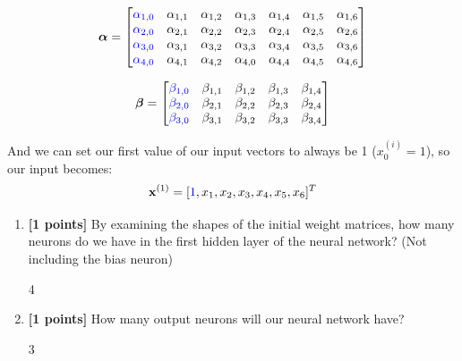 \documentclass[11pt]{article}
\numberwithin{equation}{section} %
\numberwithin{figure}{section} %
\numberwithin{table}{section} %
\newcommand{\xv}{\mathbf{x}}
\newcommand{\points}[1]{{\bf [#1 points]}}
\begin{document}
\begin{enumerate}
$$\boldsymbol{\alpha}=
    \begin{bmatrix}
    \textcolor{blue}{\alpha_{1,0}} & \alpha_{1,1} & \alpha_{1,2} & \alpha_{1,3} & \alpha_{1,4} & \alpha_{1,5} & \alpha_{1,6} \\
    \textcolor{blue}{\alpha_{2,0}} & \alpha_{2,1} & \alpha_{2,2} & \alpha_{2,3} & \alpha_{2,4} & \alpha_{2,5} & \alpha_{2,6} \\
    \textcolor{blue}{\alpha_{3,0}} & \alpha_{3,1} & \alpha_{3,2} & \alpha_{3,3} & \alpha_{3,4} & \alpha_{3,5} & \alpha_{3,6} \\
    \textcolor{blue}{\alpha_{4,0}} & \alpha_{4,1} & \alpha_{4,2} & \alpha_{4,0} & \alpha_{4,4} & \alpha_{4,5} & \alpha_{4,6}
    \end{bmatrix}$$
    
$$\boldsymbol{\beta}=
    \begin{bmatrix}
    \textcolor{blue}{\beta_{1,0}} & \beta_{1,1} & \beta_{1,2} & \beta_{1,3} & \beta_{1,4} \\
    \textcolor{blue}{\beta_{2,0}} & \beta_{2,1} & \beta_{2,2} & \beta_{2,3} & \beta_{2,4} \\
    \textcolor{blue}{\beta_{3,0}} & \beta_{3,1} & \beta_{3,2} & \beta_{3,3} & \beta_{3,4}
    \end{bmatrix}$$

    And we can set our first value of our input vectors to always be 1 ($x_0^{(i)} = 1$), so our input becomes: $$\xv^{(1)}=[\textcolor{blue}{1},x_1,x_2,x_3,x_4,x_5,x_6]^T$$
    
    
    \begin{enumerate}
        \item \points{1} By examining the shapes of the initial weight matrices, how many neurons do we have in the first hidden layer of the neural network? (Not including the bias neuron)
        
        \begin{tcolorbox}[fit,height=1cm, width=2cm, blank, borderline={1pt}{-2pt}]
            \begin{center}\huge4\end{center}
        \end{tcolorbox}
        
        
        
        
        \item \points{1} How many output neurons will our neural network have?
        
        \begin{tcolorbox}[fit,height=1cm, width=2cm, blank, borderline={1pt}{-2pt}]
            \begin{center}\huge3\end{center}
        \end{tcolorbox}
        

\end{enumerate}
\end{enumerate}
\end{document}
